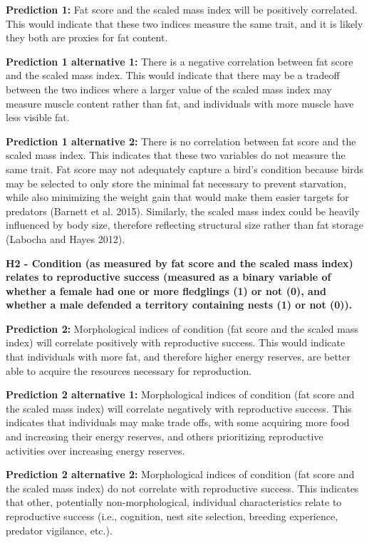 \documentclass[
]{article}
\begin{document}
\textbf{Prediction 1:} Fat score and the scaled mass index will be
positively correlated. This would indicate that these two indices
measure the same trait, and it is likely they both are proxies for fat
content.

\textbf{Prediction 1 alternative 1:} There is a negative correlation
between fat score and the scaled mass index. This would indicate that
there may be a tradeoff between the two indices where a larger value of
the scaled mass index may measure muscle content rather than fat, and
individuals with more muscle have less visible fat.

\textbf{Prediction 1 alternative 2:} There is no correlation between fat
score and the scaled mass index. This indicates that these two variables
do not measure the same trait. Fat score may not adequately capture a
bird's condition because birds may be selected to only store the minimal
fat necessary to prevent starvation, while also minimizing the weight
gain that would make them easier targets for predators (Barnett et al.
2015). Similarly, the scaled mass index could be heavily influenced by
body size, therefore reflecting structural size rather than fat storage
(Labocha and Hayes 2012).

\textbf{H2 - Condition (as measured by fat score and the scaled mass
index) relates to reproductive success (measured as a binary variable of
whether a female had one or more fledglings (1) or not (0), and whether
a male defended a territory containing nests (1) or not (0)).}

\textbf{Prediction 2:} Morphological indices of condition (fat score and
the scaled mass index) will correlate positively with reproductive
success. This would indicate that individuals with more fat, and
therefore higher energy reserves, are better able to acquire the
resources necessary for reproduction.

\textbf{Prediction 2 alternative 1:} Morphological indices of condition
(fat score and the scaled mass index) will correlate negatively with
reproductive success. This indicates that individuals may make trade
offs, with some acquiring more food and increasing their energy
reserves, and others prioritizing reproductive activities over
increasing energy reserves.

\textbf{Prediction 2 alternative 2:} Morphological indices of condition
(fat score and the scaled mass index) do not correlate with reproductive
success. This indicates that other, potentially non-morphological,
individual characteristics relate to reproductive success (i.e.,
cognition, nest site selection, breeding experience, predator vigilance,
etc.).
\end{document}
